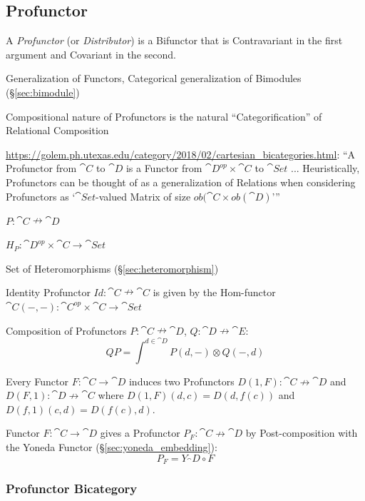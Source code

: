 \subsection{Profunctor}\label{sec:profunctor}

A \emph{Profunctor} (or \emph{Distributor}) is a Bifunctor that is Contravariant
in the first argument and Covariant in the second.

Generalization of Functors, Categorical generalization of Bimodules
(\S\ref{sec:bimodule})

Compositional nature of Profunctors is the natural ``Categorification'' of
Relational Composition

\url{https://golem.ph.utexas.edu/category/2018/02/cartesian_bicategories.html}:
``A Profunctor from $\cat{C}$ to $\cat{D}$ is a Functor from $\cat{D}^{op}
\times \cat{C}$ to $\cat{Set}$ ... Heuristically, Profunctors can be thought of
as a generalization of Relations when considering Profunctors as
`$\cat{Set}$-valued Matrix of size $ob(\cat{C} \times ob(\cat{D})$'''

$P : \cat{C} \nrightarrow \cat{D}$

$H_P : \cat{D}^{op} \times \cat{C} \rightarrow \cat{Set}$

Set of Heteromorphisms (\S\ref{sec:heteromorphism})

Identity Profunctor $Id : \cat{C} \nrightarrow \cat{C}$ is given by
the Hom-functor $\cat{C}(-,-) : \cat{C}^{op} \times \cat{C}
\rightarrow \cat{Set}$

Composition of Profunctors $P : \cat{C} \nrightarrow \cat{D}$, $Q :
\cat{D} \nrightarrow \cat{E}$:
\[
  Q P = \int^{d \in \cat{D}} P(d,-) \otimes Q(-,d)
\]

Every Functor $F : \cat{C} \rightarrow \cat{D}$ induces two
Profunctors $D(1,F) : \cat{C} \nrightarrow \cat{D}$ and $D(F,1)
: \cat{D} \nrightarrow \cat{C}$ where $D(1,F)(d,c) = D(d,f(c))$
and $D(f,1)(c,d) = D(f(c),d)$.

Functor $F : \cat{C} \rightarrow \cat{D}$ gives a Profunctor $P_F :
\cat{C} \nrightarrow \cat{D}$ by Post-composition with the Yoneda
Functor (\S\ref{sec:yoneda_embedding}):
\[
  P_F = Y_\cat{D} \circ F
\]



\subsubsection{Profunctor Bicategory}\label{sec:profunctor_bicategory}

